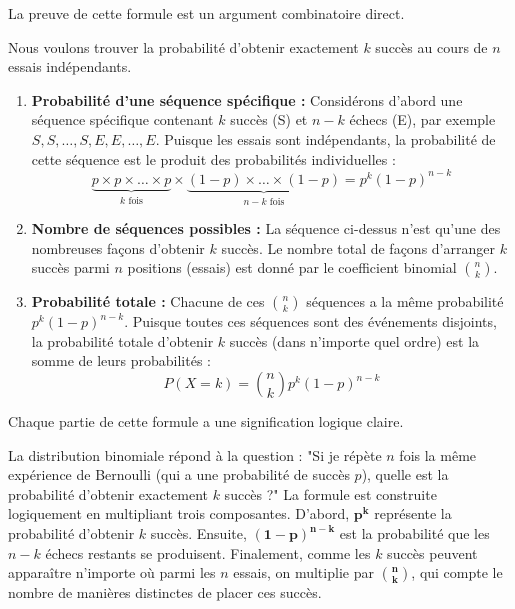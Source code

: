La preuve de cette formule est un argument combinatoire direct.

\begin{proofbox}
Nous voulons trouver la probabilité d'obtenir exactement $k$ succès au cours de $n$ essais indépendants.
\begin{enumerate}
    \item \textbf{Probabilité d'une séquence spécifique :} Considérons d'abord une séquence spécifique contenant $k$ succès (S) et $n-k$ échecs (E), par exemple $S, S, \dots, S, E, E, \dots, E$.
    Puisque les essais sont indépendants, la probabilité de cette séquence est le produit des probabilités individuelles :
    $$ \underbrace{p \times p \times \dots \times p}_{k \text{ fois}} \times \underbrace{(1-p) \times \dots \times (1-p)}_{n-k \text{ fois}} = p^k (1-p)^{n-k} $$
    
    \item \textbf{Nombre de séquences possibles :} La séquence ci-dessus n'est qu'une des nombreuses façons d'obtenir $k$ succès. Le nombre total de façons d'arranger $k$ succès parmi $n$ positions (essais) est donné par le coefficient binomial $\binom{n}{k}$.
    
    \item \textbf{Probabilité totale :} Chacune de ces $\binom{n}{k}$ séquences a la même probabilité $p^k (1-p)^{n-k}$. Puisque toutes ces séquences sont des événements disjoints, la probabilité totale d'obtenir $k$ succès (dans n'importe quel ordre) est la somme de leurs probabilités :
    $$ P(X=k) = \binom{n}{k} p^k (1-p)^{n-k} $$
\end{enumerate}
\end{proofbox}

Chaque partie de cette formule a une signification logique claire.

\begin{intuitionbox}
La distribution binomiale répond à la question : "Si je répète $n$ fois la même expérience de Bernoulli (qui a une probabilité de succès $p$), quelle est la probabilité d'obtenir exactement $k$ succès ?"
La formule est construite logiquement en multipliant trois composantes. D'abord, $\mathbf{p^k}$ représente la probabilité d'obtenir $k$ succès. Ensuite, $\mathbf{(1-p)^{n-k}}$ est la probabilité que les $n-k$ échecs restants se produisent. Finalement, comme les $k$ succès peuvent apparaître n'importe où parmi les $n$ essais, on multiplie par $\mathbf{\binom{n}{k}}$, qui compte le nombre de manières distinctes de placer ces succès.
\end{intuitionbox}

